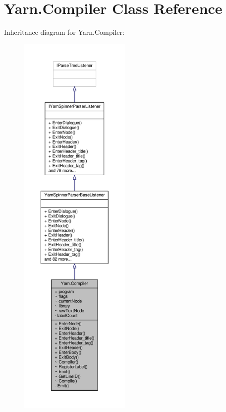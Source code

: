 \hypertarget{a00053}{\section{Yarn.\-Compiler Class Reference}
\label{a00053}
}


Inheritance diagram for Yarn.\-Compiler\-:
\nopagebreak
\begin{figure}[H]
\begin{center}
\leavevmode
\includegraphics[height=550pt]{a00565}
\end{center}
\end{figure}


